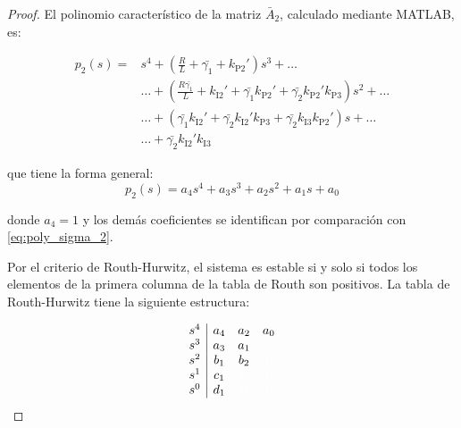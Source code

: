 \begin{lemma}
\begin{proof}
        El polinomio característico de la matriz $\bar{A}_2$, calculado mediante MATLAB, es:

        \begin{equation}\label{eq:poly_sigma_2}
            \begin{split}
                p_2(s) =& s^4 + \left(\frac{R}{L} + \bar{\gamma_1} + k_{\textrm{P2}}'\right)s^3 + \ldots 
                \\ 
                &\ldots + \left( \frac{R\bar{\gamma_1}}{L} + k_{\textrm{I2}}' + \bar{\gamma_1}k_{\textrm{P2}}' + \bar{\gamma_2}k_{\textrm{P2}}'k_{\textrm{P3}} \right)s^2 + \ldots 
                \\
                &\ldots + \left( \bar{\gamma_1}k_{\textrm{I2}}' + \bar{\gamma_2}k_{\textrm{I2}}'k_{\textrm{P3}} + \bar{\gamma_2}k_{\textrm{I3}}k_{\textrm{P2}}' \right)s + \ldots
                \\
                &\ldots + \bar{\gamma_2}k_{\textrm{I2}}'k_{\textrm{I3}}
            \end{split}
        \end{equation}

        que tiene la forma general:
        \begin{equation}\label{eq:poly_sigma_2_form}
            p_2(s) = a_4s^4 + a_3s^3 + a_2s^2 + a_1s + a_0
        \end{equation}

        donde $a_4 = 1$ y los demás coeficientes se identifican por comparación con \eqref{eq:poly_sigma_2}.

        Por el criterio de Routh-Hurwitz, el sistema es estable si y solo si todos los elementos de la primera columna de la tabla de Routh son positivos. La tabla de Routh-Hurwitz tiene la siguiente estructura:

        \begin{equation}
        \begin{array}{c|ccc}
        s^4 & a_4 & a_2 & a_0 \\
        s^3 & a_3 & a_1 & \textcolor{white}{0} \\
        s^2 & b_1 & b_2 & \textcolor{white}{0} \\
        s^1 & c_1 & \textcolor{white}{0} & \textcolor{white}{0} \\
        s^0 & d_1 & \textcolor{white}{0} & \textcolor{white}{0}
        \end{array} \label{eq:rh_table}
        \end{equation}


\end{proof}
\end{lemma}
